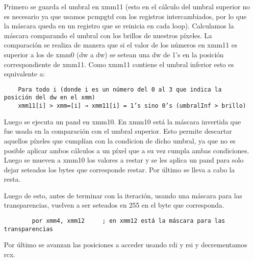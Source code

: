 \par Primero se guarda el umbral en xmm11 (esto en el cálculo del umbral superior no es necesario ya que usamos pcmpgtd con los registros intercambiados, por lo que la máscara queda en un registro que se reinicia en cada loop).
Calculamos la máscara comparando el umbral con los brillos de nuestros píxeles. La comparación se realiza de manera que si el valor de los números en xmm11 es superior a los de xmm0 (dw a dw) se setean una dw de 1’s en la posición correspondiente de xmm11. Como xmm11 contiene el umbral inferior esto es equivalente a:

\begin{verbatim}
    Para todo i (donde i es un número del 0 al 3 que indica la posición del dw en el xmm)
    xmm11[i] > xmm=[i] → xmm11[i] = 1’s sino 0’s (umbralInf > brillo)	
\end{verbatim}

\par Luego se ejecuta un pand en xmm10. En xmm10 está la máscara invertida que fue usada en la comparación con el umbral superior. Esto permite descartar aquellos píxeles que cumplían con la condicion de dicho umbral, ya que no es posible aplicar ambos cálculos a un píxel que a su vez cumpla ambas condiciones.
Luego se mueven a xmm10 los valores a restar y se les aplica un pand para solo dejar seteados los bytes que corresponde restar. Por último se lleva a cabo la resta.

\par Luego de esto, antes de terminar con la iteración, usando una máscara para las transparencias, vuelven a ser seteados en 255 en el byte que corresponda.\\
\begin{codesnippet}
        \begin{verbatim}
        por xmm4, xmm12     ; en xmm12 está la máscara para las transparencias
	\end{verbatim}
\end{codesnippet}

Por último se avanzan las posiciones a acceder usando rdi y rsi y decrementamos rcx.